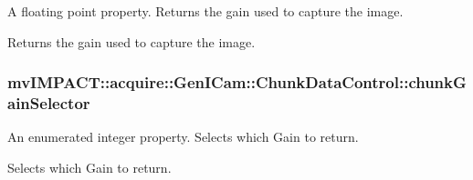 A floating point property. Returns the gain used to capture the image. 

Returns the gain used to capture the image. \hypertarget{classmv_i_m_p_a_c_t_1_1acquire_1_1_gen_i_cam_1_1_chunk_data_control_a9d9f20487202b9100f118509754ecde4}{
\subsubsection[{chunk\+Gain\+Selector}]{ mv\+I\+M\+P\+A\+C\+T\+::acquire\+::\+Gen\+I\+Cam\+::\+Chunk\+Data\+Control\+::chunk\+Gain\+Selector}}\label{classmv_i_m_p_a_c_t_1_1acquire_1_1_gen_i_cam_1_1_chunk_data_control_a9d9f20487202b9100f118509754ecde4}


An enumerated integer property. Selects which Gain to return. 

Selects which Gain to return.

